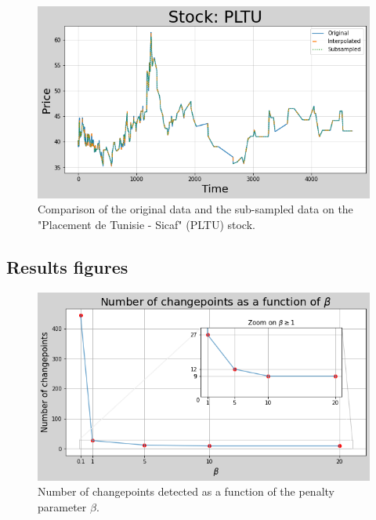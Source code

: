 \documentclass[11pt]{article}
\begin{document}
\begin{figure}[H]
    \centering
    \begin{minipage}[t]{0.7\textwidth}
        \includegraphics[width=\textwidth]{figures/preprocessing/subsample.png}
        \caption{Comparison of the original data and the sub-sampled data on the "Placement de Tunisie - Sicaf" (PLTU) stock.}
        \label{fig:subsample}
    \end{minipage}
\end{figure}

\subsection{Results figures}

\begin{figure}[H]
    \centering
    \begin{minipage}[t]{0.52\textwidth}
        \includegraphics[width=\textwidth]{figures/results/cgpts_beta.png}
        \caption{Number of changepoints detected as a function of the penalty parameter $\beta$.}
        \label{fig:cgpts_beta}
    \end{minipage}
\end{figure}
\end{document}
